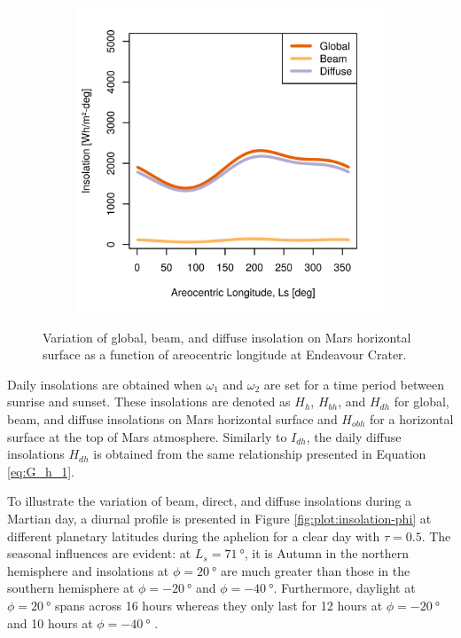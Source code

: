 \begin{figure}[h]
\begin{subfigure}[t]{\subfigureWidth}
  		\label{fig:sub:insolation-ls-tau-factor-2}
  	\end{subfigure}\hfill
	   \begin{subfigure}[t]{\subfigureWidth}
      \centering
  		\includegraphics[height=\graphicsHeight]{sections/mars-solar-energy/solar-radiation/plots/hh-hbh-and-hdh-as-a-function-of-ls-for-tau3-phi205-and-albedo-027}
  		\label{fig:sub:insolation-ls-tau-factor-3}
	   \end{subfigure}\hfill
	\caption{Variation of global, beam, and diffuse insolation on Mars horizontal surface as a function of areocentric longitude at Endeavour Crater.}
	\label{fig:plot:insolation-ls}
\vspace{-2ex}
\end{figure}

Daily insolations are obtained when $\omega_1$ and $\omega_2$ are set for a time period between sunrise and sunset. These insolations are denoted as $H_{h}$, $H_{bh}$, and $H_{dh}$ for global, beam, and diffuse insolations on Mars horizontal surface and $H_{obh}$ for a horizontal surface at the top of Mars atmosphere. Similarly to $I_{dh}$, the daily diffuse insolations $H_{dh}$ is obtained from the same relationship presented in Equation \ref{eq:G_h_1}.

To illustrate the variation of beam, direct, and diffuse insolations during a Martian day, a diurnal profile is presented in Figure \ref{fig:plot:insolation-phi} at different planetary latitudes during the aphelion for a clear day with $\tau = 0.5$. The seasonal influences are evident: at $L_{s} = \SI{71}{\degree}$, it is Autumn in the northern hemisphere and insolations at $\phi = \SI{20}{\degree}$ are much greater than those in the southern hemisphere at $\phi = \SI{-20}{\degree}$ and $\phi = \SI{-40}{\degree}$. Furthermore, daylight at $\phi = \SI{20}{\degree}$ spans across 16 hours whereas they only last for 12 hours at $\phi = \SI{-20}{\degree}$ and 10 hours at $\phi = \SI{-40}{\degree}$ .


